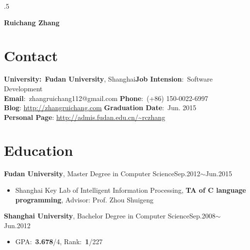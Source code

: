 \documentclass[margin]{res}
\begin{document}
 \moveleft.5\hoffset\centerline{\large\bf Ruichang Zhang}
 \iffalse
 \moveleft\hoffset\vbox{\hrule width\resumewidth height 1pt}\smallskip
 \moveleft.5\hoffset\centerline{Address: Room 502, Yifu Building, \textbf{Fudan University}, 220 Handan Road, Shanghai 200433, China.}
 \moveleft.5\hoffset\centerline{Phone: (+86) 150-0022-6997, Email: rczhang@fudan.edu.cn}
\moveleft.5\hoffset\centerline{Homepage: }%
\fi
\begin{resume}
\setlength{\parskip}{0.1em}
\section{Contact}
\textbf{University:}~{\bf Fudan University}, Shanghai\hfill \textbf{Job Intension}:~Software Development\\
\textbf{Email}:~zhangruichang112@gmail.com \hfill  \textbf{Phone}:~(+86) 150-0022-6997\\
\textbf{Blog}: \url{http://zhangruichang.com} \hfill \textbf{Graduation Date}:~Jun. 2015\\
\textbf{Personal Page}: \url{http://admis.fudan.edu.cn/~rczhang}
\section{Education}
 {\bf Fudan University}, Master Degree in Computer Science\hfill Sep.2012$\sim$Jun.2015
 \begin{itemize} \itemsep -1pt  %
 \item Shanghai Key Lab of Intelligent Information Processing, \textbf{TA of C language programming}, Advisor: Prof. Zhou Shuigeng
 \end{itemize}
 {\bf Shanghai University}, Bachelor Degree in Computer Science\hfill Sep.2008$\sim$ Jun.2012
\begin{itemize} \itemsep -1pt %
\item GPA:~\textbf{3.678}/4, Rank:~\textbf{1}/227
\end{itemize}

\end{resume}
\end{document}

